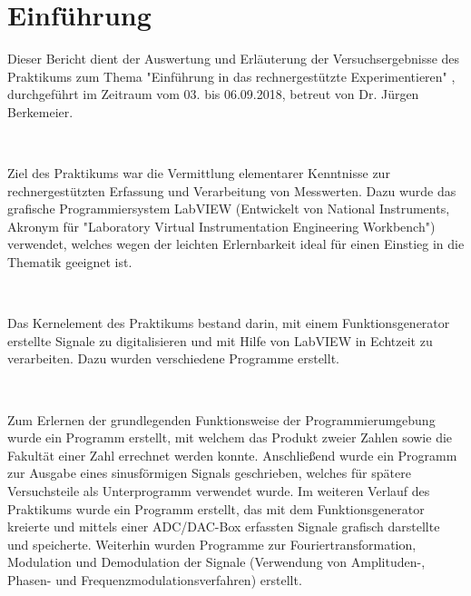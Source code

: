 \section{Einführung}

Dieser Bericht dient der Auswertung und Erläuterung der Versuchsergebnisse des Praktikums zum Thema  "Einführung in das rechnergestützte Experimentieren" , durchgeführt im Zeitraum vom 03. bis 06.09.2018, betreut von Dr. Jürgen Berkemeier.
	
\
	
Ziel des Praktikums war die Vermittlung elementarer Kenntnisse zur rechnergestützten Erfassung und Verarbeitung von Messwerten. Dazu wurde das grafische Programmiersystem LabVIEW (Entwickelt von National Instruments, Akronym für "Laboratory Virtual Instrumentation Engineering Workbench"\cite{LV}) verwendet, welches wegen der leichten Erlernbarkeit ideal für einen Einstieg in die Thematik geeignet ist.

\

Das Kernelement des Praktikums bestand darin, mit einem Funktionsgenerator erstellte Signale zu digitalisieren und mit Hilfe von LabVIEW in Echtzeit zu verarbeiten. Dazu wurden verschiedene Programme erstellt.

\

Zum Erlernen der grundlegenden Funktionsweise der Programmierumgebung wurde ein Programm erstellt, mit welchem das Produkt zweier Zahlen sowie die Fakultät einer Zahl errechnet werden konnte. Anschließend wurde ein Programm zur Ausgabe eines sinusförmigen Signals geschrieben, welches für spätere Versuchsteile als Unterprogramm verwendet wurde. Im weiteren Verlauf des Praktikums wurde ein Programm erstellt, das mit dem Funktionsgenerator kreierte und mittels einer ADC/DAC-Box erfassten Signale grafisch darstellte und speicherte. Weiterhin wurden Programme zur Fouriertransformation, Modulation und Demodulation der Signale (Verwendung von Amplituden-, Phasen- und Frequenzmodulationsverfahren) erstellt.
